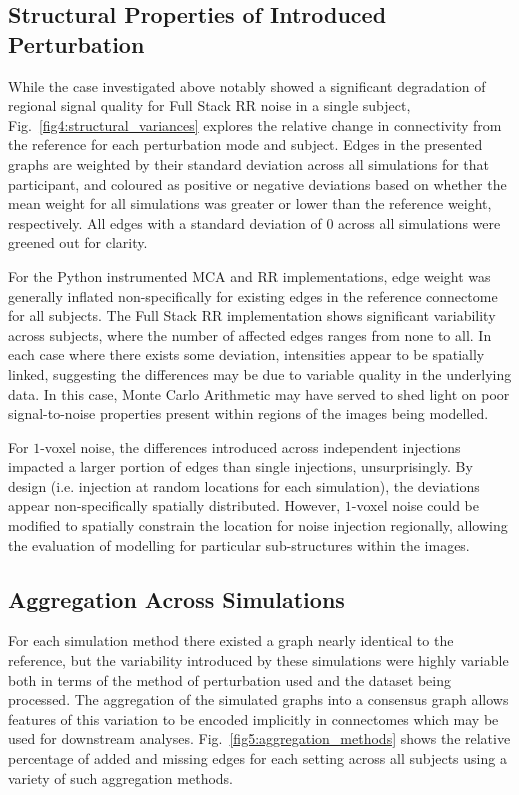 \documentclass[fleqn,12pt]{SelfArx_ch} %
\begin{document}
\subsection{Structural Properties of Introduced Perturbation}
While the case investigated above notably showed a significant degradation of regional signal quality for Full Stack RR
noise in a single subject, Fig.~\ref{fig4:structural_variances} explores the relative change in connectivity from the
reference for each perturbation mode and subject. Edges in the presented graphs are weighted by their standard
deviation across all simulations for that participant, and coloured as positive or negative deviations based on whether
the mean weight for all simulations was greater or lower than the reference weight, respectively. All edges with a
standard deviation of $0$ across all simulations were greened out for clarity.

For the Python instrumented MCA and RR implementations, edge weight was generally inflated non-specifically for
existing edges in the reference connectome for all subjects. The Full Stack RR implementation shows significant
variability across subjects, where the number of affected edges ranges from none to all. In each case where there
exists some deviation, intensities appear to be spatially linked, suggesting the differences may be due to variable
quality in the underlying data. In this case, Monte Carlo Arithmetic may have served to shed light on poor
signal-to-noise properties present within regions of the images being modelled.

For $1$-voxel noise, the differences introduced across independent injections impacted a larger portion of edges than
single injections, unsurprisingly. By design (i.e. injection at random locations for each simulation), the deviations
appear non-specifically spatially distributed. However, $1$-voxel noise could be modified to spatially constrain the
location for noise injection regionally, allowing the evaluation of modelling for particular sub-structures within the
images.

\subsection{Aggregation Across Simulations}

For each simulation method there existed a graph nearly identical to the reference, but the variability introduced by
these simulations were highly variable both in terms of the method of perturbation used and the dataset being
processed. The aggregation of the simulated graphs into a consensus graph allows features of this variation to be
encoded implicitly in connectomes which may be used for downstream analyses. Fig.~\ref{fig5:aggregation_methods} shows
the relative percentage of added and missing edges for each setting across all subjects using a variety of such
aggregation methods.
\end{document}
